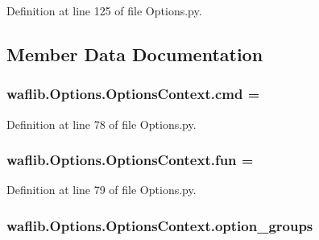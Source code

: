 Definition at line 125 of file Options.\+py.



\subsection{Member Data Documentation}
\subsubsection[{\texorpdfstring{cmd}{cmd}}]{ waflib.\+Options.\+Options\+Context.\+cmd = \textquotesingle{}\hspace{0.3cm}{\ttfamily [static]}}\hypertarget{classwaflib_1_1_options_1_1_options_context_add9bbf41305687691619a196c65eceb3}{}\label{classwaflib_1_1_options_1_1_options_context_add9bbf41305687691619a196c65eceb3}


Definition at line 78 of file Options.\+py.

\subsubsection[{\texorpdfstring{fun}{fun}}]{ waflib.\+Options.\+Options\+Context.\+fun = \textquotesingle{}\hspace{0.3cm}{\ttfamily [static]}}\hypertarget{classwaflib_1_1_options_1_1_options_context_ac8c3e2705195f80cf5b184456bb4cafd}{}\label{classwaflib_1_1_options_1_1_options_context_ac8c3e2705195f80cf5b184456bb4cafd}


Definition at line 79 of file Options.\+py.

\subsubsection[{\texorpdfstring{option\+\_\+groups}{option_groups}}]{\setlength{\rightskip}{0pt plus 5cm}waflib.\+Options.\+Options\+Context.\+option\+\_\+groups}\hypertarget{classwaflib_1_1_options_1_1_options_context_a164c4353e025d250379721ee8bed0760}{}\label{classwaflib_1_1_options_1_1_options_context_a164c4353e025d250379721ee8bed0760}


